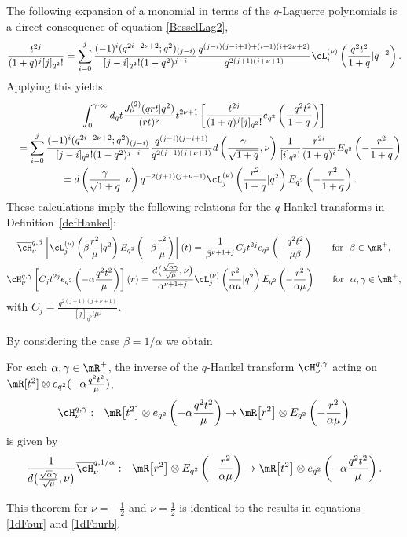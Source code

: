The following expansion of a monomial in terms of the $q$-Laguerre polynomials is a direct consequence of equation \eqref{BesselLag2},
\begin{gather*}
\frac{t^{2j}}{(1+q)^j[j]_{q^2}!}=\sum_{i=0}^j\frac{(-1)^i(q^{2i+2\nu+2};q^2)_{(j-i)}}{[j-i]_{q^2}!(1-q^2)^{j-i}}
\frac{q^{(j-i)(j-i+1)+(i+1)(i+2\nu+2)}}{q^{2(j+1)(j+\nu+1)}}\cL_i^{(\nu)}\left(\frac{q^2t^2}{1+q}|q^{-2}\right).
\end{gather*}
Applying this yields
\begin{gather*}
\int_0^{\gamma\cdot\infty}d_qt\frac{J_\nu^{(2)}(qrt|q^2)}{(rt)^{\nu}}t^{2\nu+1}
\left[\frac{t^{2j}}{(1+q)^j[j]_{q^2}!}e_{q^2}\left(\frac{-q^2t^2}{1+q}\right)\right]\\
\quad{}=\sum_{i=0}^j\frac{(-1)^i(q^{2i+2\nu+2};q^2)_{(j-i)}}{[j-i]_{q^2}!(1-q^2)^{j-i}}\frac{q^{(j-i)(j-i+1)}}{q^{2(j+1)(j+\nu+1)}}
d\left(\frac{\gamma}{\sqrt{1+q}},\nu\right)\frac{1}{[i]_{q^2}!}\frac{r^{2i}}{(1+q)^i}E_{q^2}\left(-\frac{r^2}{1+q}\right)\\
\quad{}=d\left(\frac{\gamma}{\sqrt{1+q}},\nu\right) q^{-2(j+1)(j+\nu+1)}\cL^{(\nu)}_j\left(\frac{r^2}{1+q}|q^2\right)E_{q^2}\left(-\frac{r^2}{1+q}\right).
\end{gather*}
These calculations imply the following relations for the $q$-Hankel transforms in Def\/inition~\ref{defHankel}:
\begin{gather*}
\overline{\cH}_{\nu}^{q,\beta}\left[\cL_j^{(\nu)}\left(\beta\frac{r^2}{\mu}|q^2\right)E_{q^2}\left(-\beta\frac{r^2}{\mu}\right)\right](t)=
\frac{1}{\beta^{\nu+1+j}}C_jt^{2j}e_{q^2}\left(-\frac{q^2t^2}{\mu\beta}\right)\qquad\mbox{for} \ \ \beta\in\mR^+,\\
\cH^{q,\gamma}_{\nu}\left[C_jt^{2j}e_{q^2}\left(-\alpha\frac{q^2t^2}{\mu}\right)\right](r)= \frac{d\big(\frac{\sqrt{\alpha}\gamma}{\sqrt{\mu}},\nu\big) }{\alpha^{\nu+1+j}}\cL^{(\nu)}_j\left(\frac{r^2}{\alpha\mu}|q^2\right)E_{q^2}\left(-\frac{r^2}{\alpha\mu}\right)\!\qquad\mbox{for} \ \ \alpha,\gamma\in\mR^+,
\end{gather*}
with $C_j=\frac{q^{2(j+1)(j+\nu+1)}}{[j]_{q^2}!\mu^j}$.


By considering the case $\beta=1/\alpha$ we obtain
\begin{theorem}
\label{Hankelinv}
For each $\alpha,\gamma\in\mR^+$, the inverse of the $q$-Hankel transform $\cH_\nu^{q,\gamma}$ acting on $\mR[t^2]\otimes e_{q^2}(-\alpha\frac{q^2t^2}{\mu})$,
\begin{gather*}
\cH_\nu^{q,\gamma}: \ \ \mR\big[t^2\big]\otimes e_{q^2}\left(-\alpha\frac{q^2t^2}{\mu}\right) \to\mR\big[r^2\big]\otimes E_{q^2}\left(-\frac{r^2}{\alpha\mu}\right)
\end{gather*}
is given by
\begin{gather*}
\frac{1}{d\big(\frac{\sqrt\alpha \gamma}{\sqrt\mu},\nu\big)}\overline{\cH}^{q,1/\alpha}_{\nu}: \ \ \mR\big[r^2\big]\otimes E_{q^2}\left(-\frac{r^2}{\alpha\mu}\right)\to \mR\big[t^2\big]\otimes e_{q^2}\left(-\alpha\frac{q^2t^2}{\mu}\right).
\end{gather*}
\end{theorem}
This theorem for $\nu=-\frac{1}{2}$ and $\nu=\frac{1}{2}$ is identical to the results in equations \eqref{1dFour} and \eqref{1dFourb}.


